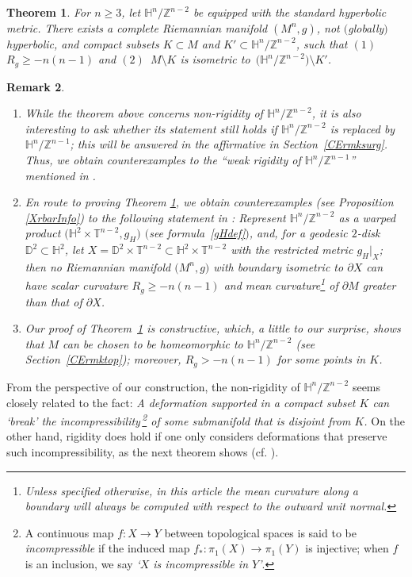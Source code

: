 \documentclass[10pt,a4paper]{amsart}
\numberwithin{equation}{section}
\newtheorem{Theorem}{Theorem}[section]
\newtheorem{Remark}[Theorem]{Remark} }
\def\H{\mathbb{H}}
\def\T{\mathbb{T}}
\def\Z{\mathbb{Z}}
\def\D{\mathbb{D}}
\begin{document}
\begin{Theorem}\label{counterexample}
For $n\ge 3$, let $\mathbb{H}^n/\mathbb{Z}^{n-2}$ be equipped with the standard hyperbolic metric.
There exists a complete Riemannian manifold $(M^n,g)$, not $($globally$)$ hyperbolic, and
compact subsets $K\subset M$ and $K'\subset\H^n/\Z^{n-2}$, such that $(1)$~$R_g\ge -n(n-1)$ and $(2)$~$M\setminus K$ is isometric to~$\big(\mathbb{H}^n/\mathbb{Z}^{n-2}\big)\setminus K'$.	
\end{Theorem}
\begin{Remark}\quad
\begin{enumerate}\itemsep=0pt
	\item[$(1)$] While the theorem above concerns non-rigidity of $\H^n/\Z^{n-2}$, it is also interesting to
    ask whether its statement still holds if $\H^n/\Z^{n-2}$ is replaced by $\H^n/\Z^{n-1}$; this will be answered in the affirmative in Section~\ref{CErmksurg}.
    Thus, we obtain counterexamples to the ``weak rigidity of $\mathbb{H}^n/\mathbb{Z}^{n-1}$'' mentioned in \cite[p.~678]{Gromov18GAFA}.

   	 \item[$(2)$] En route to proving Theorem \ref{counterexample}, we obtain counterexamples
    (see Proposition \ref{XrbarInfo}) to the following statement in \cite[p.~12]{Gr2019}: \emph{Represent $\H^n/\Z^{n-2}$ as a warped product $\bigl(\H^2\times \T^{n-2}, g_H\bigr)$ $($see formula~\eqref{gHdef}$)$, and, for a geodesic $2$-disk $\D^2\subset\H^2$, let $X = \D^2 \times \T^{n-2}\subset \H^2\times \T^{n-2}$ with the restricted metric $g_H|_X$; then no Riemannian manifold $\big(M^n,g\big)$ with boundary isometric to $\partial X$ can have scalar curvature $R_g\ge -n(n-1)$ and mean curvature\footnote{Unless specified otherwise, in this article the mean curvature along a boundary will always be computed with respect to the \emph{outward} unit normal.} of $\partial M$ greater than that of $\partial X$.}

    \item[$(3)$] Our proof of Theorem~\ref{counterexample} is constructive, which, a little to our surprise, shows that $M$ can be chosen to be homeomorphic to $\H^n/\Z^{n-2}$ (see Section~\ref{CErmktop}); moreover, $R_g> -n(n-1)$ for some
    points in $K$.
\end{enumerate}
\end{Remark}

From the perspective of our construction, the non-rigidity of $\H^n/\Z^{n-2}$ seems closely related to the fact:
\emph{A deformation supported in a compact subset $K$ can
`break' the incompressibility\,\footnote{A continuous map $f\colon X\rightarrow Y$ between topological spaces
is said to be \emph{incompressible} if the induced map $f_*\colon \pi_1(X)\rightarrow \pi_1(Y)$ is injective;
when $f$ is an inclusion, we say \emph{`$X$ is incompressible in $Y$'}.} of some submanifold that is disjoint from $K$.}
On the other hand, rigidity does hold if one only considers deformations
that preserve such incompressibility, as the next theorem shows (cf. \cite[Theorem 1.8]{CLSZ2021}).
\end{document}
